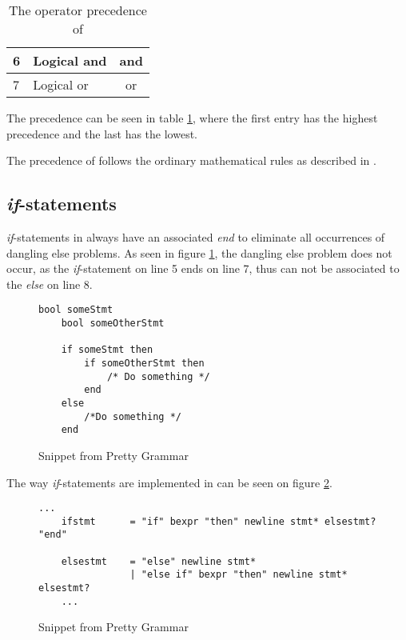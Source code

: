 \begin{table}[H]
\begin{tabular}{|l|l|c|}
6 & Logical and                                                                                                                           & and                                                                                                    \\ \hline
7 & Logical or                                                                                                                            & or                                                                                                     \\ \hline
\end{tabular}
\caption{The operator precedence of \lang{} \label{tab:precedence}}
\end{table}

The precedence can be seen in table \ref{tab:precedence}, where the first entry has the highest precedence and the last has the lowest.

The precedence of \lang{} follows the ordinary mathematical rules as described in \citep{precedence}.



\subsection{\textit{if}-statements}
\textit{if}-statements in \lang{} always have an associated \textit{end} to eliminate all occurrences of dangling else problems.
As seen in figure \ref{fig:danglingElse}, the dangling else problem does not occur, as the \textit{if}-statement on line 5 ends on line 7, thus can not be associated to the \textit{else} on line 8.

\begin{figure}[H]
    \centering
    \begin{lstlisting}[style=gglang]
    bool someStmt
    bool someOtherStmt
    
    if someStmt then
        if someOtherStmt then
            /* Do something */
        end
    else
        /*Do something */
    end
    \end{lstlisting}
    \caption{Snippet from Pretty Grammar \label{fig:danglingElse}}
\end{figure}

The way \textit{if}-statements are implemented in \lang{} can be seen on figure \ref{fig:ifGrammar}.

\begin{figure}[H]
    \centering
    \begin{lstlisting}[]
    ...
    ifstmt      = "if" bexpr "then" newline stmt* elsestmt? "end"
    
    elsestmt    = "else" newline stmt*
                | "else if" bexpr "then" newline stmt* elsestmt?
    ...
    \end{lstlisting}
    \caption{Snippet from Pretty Grammar\label{fig:ifGrammar}}
\end{figure}


